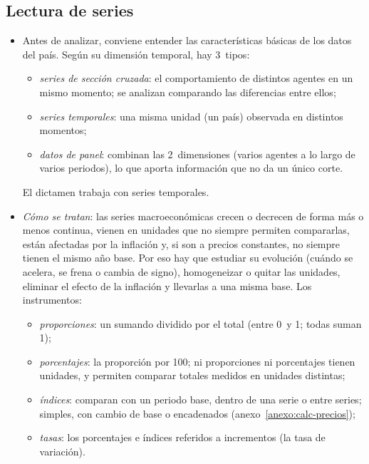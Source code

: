 \documentclass[11pt]{article}
\begin{document}
\subsection{Lectura de series}\label{anexo:lectura-series}
\begin{itemize}
\item Antes de analizar, conviene entender las características básicas de los datos del país. Según su dimensión temporal, hay 3~tipos:
  \begin{itemize}
  \item \emph{series de sección cruzada}: el comportamiento de distintos agentes en un mismo momento; se analizan comparando las diferencias entre ellos;
  \item \emph{series temporales}: una misma unidad (un país) observada en distintos momentos;
  \item \emph{datos de panel}: combinan las 2~dimensiones (varios agentes a lo largo de varios periodos), lo que aporta información que no da un único corte.
  \end{itemize}
  El dictamen trabaja con series temporales.
\item \emph{Cómo se tratan}: las series macroeconómicas crecen o decrecen de forma más o menos continua, vienen en unidades que no siempre permiten compararlas, están afectadas por la inflación y, si son a precios constantes, no siempre tienen el mismo año base. Por eso hay que estudiar su evolución (cuándo se acelera, se frena o cambia de signo), homogeneizar o quitar las unidades, eliminar el efecto de la inflación y llevarlas a una misma base. Los instrumentos:
  \begin{itemize}
  \item \emph{proporciones}: un sumando dividido por el total (entre 0~y 1; todas suman 1);
  \item \emph{porcentajes}: la proporción por 100; ni proporciones ni porcentajes tienen unidades, y permiten comparar totales medidos en unidades distintas;
  \item \emph{índices}: comparan con un periodo base, dentro de una serie o entre series; simples, con cambio de base o encadenados (anexo~\ref{anexo:calc-precios});
  \item \emph{tasas}: los porcentajes e índices referidos a incrementos (la tasa de variación).
  \end{itemize}
\end{itemize}

\end{document}
